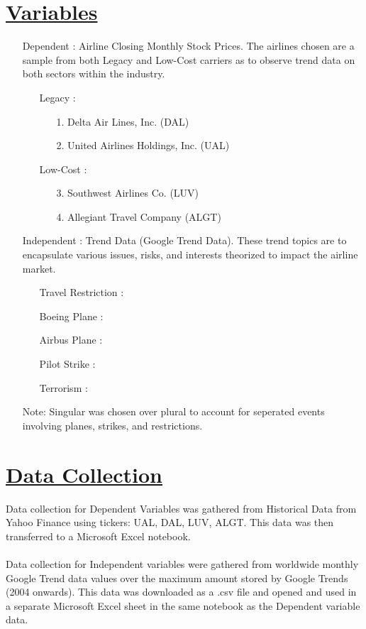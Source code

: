 \documentclass[12pt]{report}
\begin{document}
\section*{\underline{Variables}}
\begin{enumerate}
    \item[Dependent]: Airline Closing Monthly Stock Prices. The airlines chosen are a sample from both Legacy and Low-Cost carriers as to observe trend data on both sectors within the industry.
    \begin{enumerate}
        \item[Legacy]:
            \begin{enumerate}
                \item[1.]Delta Air Lines, Inc. (DAL)
                \item[2.]United Airlines Holdings, Inc. (UAL)
            \end{enumerate}
        \item[Low-Cost]:
            \begin{enumerate}
                \item[3.]Southwest Airlines Co. (LUV)
                \item[4.]Allegiant Travel Company (ALGT)
            \end{enumerate}
    \end{enumerate}
    \item[Independent]: Trend Data (Google Trend Data).
    These trend topics are to encapsulate various issues, risks, and interests theorized to impact the airline market.
        \begin{enumerate}
            \item[Travel Restriction]:
            \item[Boeing Plane]:
            \item[Airbus Plane]:
            \item[Pilot Strike]:
            \item[Terrorism]:
        \end{enumerate}
    \tiny Note: Singular was chosen over plural to account for seperated events involving planes, strikes, and restrictions.
\end{enumerate}
\section*{\underline{Data Collection}}

Data collection for Dependent Variables was gathered from Historical Data from Yahoo Finance using tickers: UAL, DAL, LUV, ALGT. This data was then transferred to a Microsoft Excel notebook.
\\ \\
Data collection for Independent variables were gathered from worldwide monthly Google Trend data values over the maximum amount stored by Google Trends (2004 onwards).
This data was downloaded as a .csv file and opened and used in a separate Microsoft Excel sheet in the same notebook as the Dependent variable data.
\end{document}
